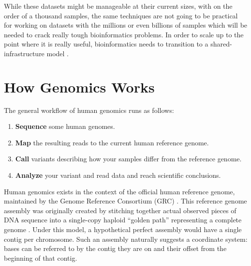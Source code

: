 \documentclass[11pt,proposal]{ucthesis}
\begin{document}
While these datasets might be manageable at their current sizes, with on the order of a thousand samples, the same techniques are not going to be practical for working on datasets with the millions or even billions of samples which will be needed to crack really tough bioinformatics problems. In order to scale up to the point where it is really useful, bioinformatics needs to transition to a shared-infrastructure model \cite{stein2010case}.


    
    
    
        
        
        

\section{How Genomics Works}

The general workflow of human genomics runs as follows:

\begin{enumerate}
\item \textbf{Sequence} some human genomes.
\item \textbf{Map} the resulting reads to the current human reference genome.
\item \textbf{Call} variants describing how your samples differ from the reference genome.
\item \textbf{Analyze} your variant and read data and reach scientific conclusions.
\end{enumerate}

Human genomics exists in the context of the official human reference genome, maintained by the Genome Reference Consortium (GRC) \cite{church2011modernizing}. This reference genome assembly was originally created by stitching together actual observed pieces of DNA sequence into a single-copy haploid ``golden path'' representing a complete genome \cite{church2011modernizing}. Under this model, a hypothetical perfect assembly would have a single contig per chromosome. Such an assembly naturally suggests a coordinate system: bases can be referred to by the contig they are on and their offset from the beginning of that contig.
\end{document}
